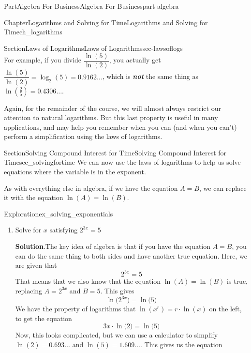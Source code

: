 \documentclass[oneside,10pt,]{tufte-book}
\newcommand{\blocktitlefont}{\relax}
\newcommand{\alert}[1]{\textbf{\textit{#1}}}
\numberwithin{equation}{chapter}
\begin{document}
\begin{partptx}{Part}{Algebra For Business}{}{Algebra For Business}{}{}{part-algebra}
\begin{chapterptx}{Chapter}{Logarithms and Solving for Time}{}{Logarithms and Solving for Time}{}{}{ch_logarithms}
\begin{sectionptx}{Section}{Laws of Logarithms}{}{Laws of Logarithms}{}{}{sec-lawsoflogs}
\begin{equation*}
\end{equation*}
For example, if you divide   \(\dfrac{\ln(5)}{\ln(2)}\), you actually get \(\dfrac{\ln(5)}{\ln(2)} = \log_2(5) = 0.9162\dots\), which is \alert{not} the same thing as \(\ln\left(\frac{2}{5}
\right)=0.4306\dots\).%
\par
Again, for the remainder of the course, we will almost always restrict our attention to natural logarithms. But this last property is useful in many applications, and may help you remember when you can (and when you can't) perform a simplification using the laws of logarithms.%
\end{sectionptx}
%
%
\typeout{************************************************}
\typeout{************************************************}
%
\begin{sectionptx}{Section}{Solving Compound Interest for Time}{}{Solving Compound Interest for Time}{}{}{sec_solvingfortime}
We can now use the laws of logarithms to help us solve equations where the variable is in the exponent.%
\par
As with everything else in algebra, if we have the equation \(A = B\), we can replace it with the equation \(\ln(A) = \ln(B)\).%
\begin{exploration}{Exploration}{}{ex_solving_exponentials}%
\begin{enumerate}[font=\bfseries,label=(\alph*),ref=\alph*]%
\item{}Solve for \(x\) satisfying \(2^{3x} = 5\)%
\par\smallskip%
\noindent\textbf{\blocktitlefont Solution}.\hypertarget{ex_solving_exponentials-1-2}{}\quad{}The key idea of algebra is that if you have the equation \(A = B\), you can do the same thing to both sides and have another true equation. Here, we are given that%
\begin{equation*}
2^{3x} = 5
\end{equation*}
That means that we also know that the equation \(\ln(A) = \ln(B)\) is true, replacing \(A=2^{3x}\) and \(B=5\).  This gives%
\begin{equation*}
\ln\Big(2^{3x}\Big) = \ln\Big( 5 \Big)
\end{equation*}
We have the property of logarithms that \(\ln(x^r) = r\cdot\ln(x)\) on the left, to get the equation%
\begin{equation*}
3x \cdot \ln\Big(2\Big) = \ln\Big( 5 \Big)
\end{equation*}
Now, this looks complicated, but we can use a calculator to simplify \(\ln(2) = 0.693\dots\) and \(\ln(5) = 1.609\dots\).  This gives us the equation%

\end{enumerate}
\end{exploration}
\end{sectionptx}
\end{chapterptx}
\end{partptx}
\end{document}

